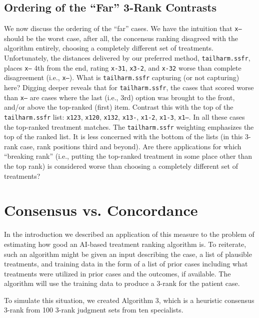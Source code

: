 \documentclass{article}
\begin{document}
\subsection{Ordering of the ``Far'' 3-Rank Contrasts}

We now discuss the ordering of the ``far'' cases. We have the intuition that \texttt{x---} should be the worst case, after all, the concensus ranking disagreed with the algorithm entirely, choosing a completely different set of treatments. Unfortunately, the distances delivered by our preferred method, \texttt{tailharm.ssfr}, places \texttt{x---} 4th from the end, rating \texttt{x-31}, \texttt{x3-2}, and \texttt{x-32} worse than complete disagreement (i.e., \texttt{x---}). What is \texttt{tailharm.ssfr} capturing (or not capturing) here? Digging deeper reveals that for \texttt{tailharm.ssfr}, the cases that scored worse than \texttt{x---} are cases where the last (i.e., 3rd) option was brought to the front, and/or above the top-ranked (first) item. Contrast this with the top of the \texttt{tailharm.ssfr} list: \texttt{x123}, \texttt{x120}, \texttt{x132}, \texttt{x13-}, \texttt{x1-2}, \texttt{x1-3}, \texttt{x1--}. In all these cases the top-ranked treatment matches. The \texttt{tailharm.ssfr} weighting emphasizes the top of the ranked list. It is less concerned with the bottom of the lists (in this 3-rank case, rank positions third and beyond).  Are there applications for which ``breaking rank'' (i.e., putting the top-ranked treatment in some place other than the top rank) is considered worse than choosing a completely different set of treatments?  

\section{Consensus vs. Concordance}

In the introduction we described an application of this measure to the problem of estimating how good an AI-based treatment ranking algorithm is. To reiterate, such an algorithm might be given an input describing the case, a list of plausible treatments, and training data in the form of a list of prior cases including what treatments were utilized in prior cases and the outcomes, if available. The algorithm will use the training data to produce a 3-rank for the patient case. 

To simulate this situation, we created Algorithm 3, which is a heuristic consensus 3-rank from 100 3-rank judgment sets from ten specialists.
\end{document}
